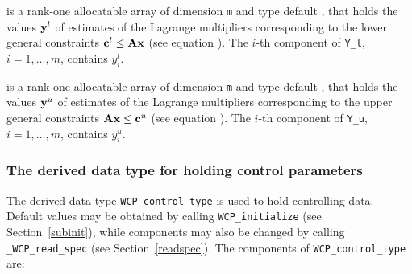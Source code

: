 \documentclass{galahad}
\newcommand{\packagename}{WCP}
\newcommand{\fullpackagename}{\libraryname\_\-\packagename}
\begin{document}
\begin{description}
 is a rank-one allocatable array of dimension {\tt m} and type default 
\realdp, that holds
the values ${\mathbf{y}}^{l}$ of estimates  of the Lagrange multipliers
corresponding to the lower general constraints ${\mathbf{c}}^{l} \leq {\mathbf{A}} {\mathbf{x}}$
(see equation ).
The $i$-th component of {\tt Y\_l}, $i = 1,  \ldots ,  m$, 
contains $y_{i}^{l}$.  

 is a rank-one allocatable array of dimension {\tt m} and type default 
\realdp, that holds
the values ${\mathbf{y}}^{u}$ of estimates  of the Lagrange multipliers
corresponding to the upper general constraints ${\mathbf{A}} {\mathbf{x}} \leq {\mathbf{c}}^{u}$
(see equation ).
The $i$-th component of {\tt Y\_u}, $i = 1,  \ldots ,  m$, 
contains $y_{i}^{u}$.  

\end{description}


\subsubsection{The derived data type for holding control 
 parameters}\label{typecontrol}
The derived data type 
{\tt \packagename\_control\_type} 
is used to hold controlling data. Default values may be obtained by calling 
{\tt \packagename\_initialize}
(see Section~\ref{subinit}),
while components may also be changed by calling 
{\tt \fullpackagename\_read\-\_spec}
(see Section~\ref{readspec}). 
The components of 
{\tt \packagename\_control\_type} 
are:
\end{document}
